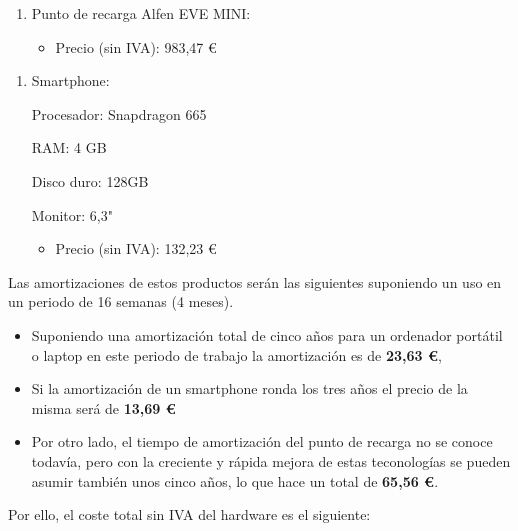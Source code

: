 \documentclass[12pt,a4paper,onecolumn,oneside]{report}
\begin{document}
\begin{enumerate}
	
	\item Punto de recarga Alfen EVE MINI:
		
	\begin{itemize}
		\item Precio (sin IVA): 983,47 \euro\\
	\end{itemize}
	
\end{enumerate}

\begin{enumerate}
	
	\item Smartphone:
	
	Procesador: Snapdragon 665
	
	RAM: 4 GB
	
	Disco duro: 128GB
	
	Monitor: 6,3"
	
	\begin{itemize}
		\item Precio (sin IVA): 132,23 \euro\\
	\end{itemize}
	
\end{enumerate}

Las amortizaciones de estos productos serán las siguientes suponiendo un uso en un periodo de 16 semanas (4 meses).

\begin{itemize}
\item Suponiendo una amortización total de cinco años para un ordenador portátil o laptop en este periodo de trabajo la amortización es de \textbf{23,63 \euro},
\item Si la amortización de un smartphone ronda los tres años el precio de la misma será de \textbf{13,69 \euro} 
\item Por otro lado, el tiempo de amortización del punto de recarga no se conoce todavía, pero con la creciente y rápida mejora de estas teconologías se pueden asumir también unos cinco años, lo que hace un total de \textbf{65,56 \euro}.
\end{itemize}

Por ello, el coste total sin IVA del hardware es el siguiente:

\begin{table}[ht]
	\centering
	\caption{Presupuesto del hardware sin IVA}
	\label{tablacostehardware}
\end{table}
\end{document}
